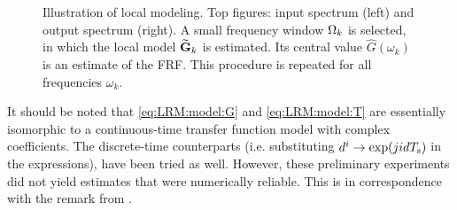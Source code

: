 \begin{figure}[htb] %
   \centering
   \setlength{\figurewidth}{0.8\columnwidth}
   \setlength{\figureheight}{0.68\figurewidth}
   
   \caption[Illustration of local modeling.]{Illustration of local modeling. Top figures: input spectrum (left) and output spectrum (right). 
   A small frequency window $\LocalWindow[k]$ is selected, in which the local model $\LocalModel[k]{G}$ is estimated. Its central value $\hat{G}(\omega_k)$ is an estimate of the \gls{FRF}. This procedure is repeated for all frequencies $\omega_k$. }
   \label{fig:nparam:illustration}
\end{figure}

\begin{remark}
It should be noted that \eqref{eq:LRM:model:G} and \eqref{eq:LRM:model:T} are essentially isomorphic to a continuous-time transfer function model with complex coefficients.
The discrete-time counterparts (i.e. substituting $d^i \to \exp (ji d \Ts)$ in the expressions), have been tried as well.
However, these preliminary experiments did not yield estimates that were numerically reliable.
This is in correspondence with the remark from \citet{Pintelon2006BJ1}.
\end{remark}

